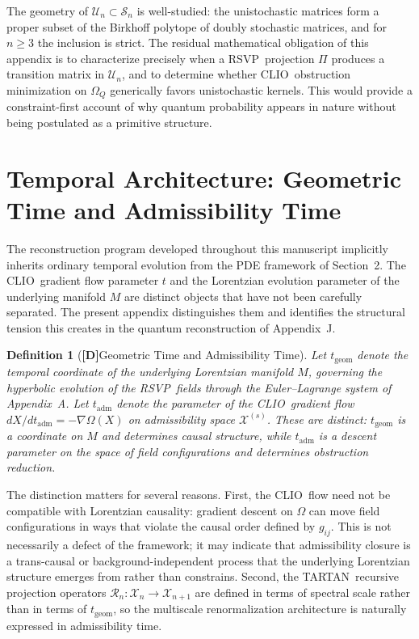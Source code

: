 \documentclass[12pt,a4paper]{article}
\newcommand{\claimD}{\textbf{[D]}\;}
\newtheorem{defn}{Definition}[section]
\newcommand{\RSVP}{\textrm{RSVP}}
\newcommand{\CLIO}{\textrm{CLIO}}
\newcommand{\TARTAN}{\textrm{TARTAN}}
\newcommand{\Field}{\mathcal{X}}
\begin{document}
The geometry of $\mathcal{U}_n\subset\mathcal{S}_n$ is well-studied: the
unistochastic matrices form a proper subset of the Birkhoff polytope of doubly
stochastic matrices, and for $n\geq 3$ the inclusion is strict. The residual
mathematical obligation of this appendix is to characterize precisely when a
\RSVP\ projection $\Pi$ produces a transition matrix in $\mathcal{U}_n$,
and to determine whether \CLIO\ obstruction minimization on $\Omega_Q$ generically
favors unistochastic kernels. This would provide a constraint-first account of
why quantum probability appears in nature without being postulated as a
primitive structure.

\section{Temporal Architecture: Geometric Time and Admissibility Time}

The reconstruction program developed throughout this manuscript implicitly
inherits ordinary temporal evolution from the PDE framework of Section~2.
The \CLIO\ gradient flow parameter $t$ and the Lorentzian evolution parameter
of the underlying manifold $M$ are distinct objects that have not been
carefully separated. The present appendix distinguishes them and identifies
the structural tension this creates in the quantum reconstruction of
Appendix~J.

\begin{defn}[\claimD Geometric Time and Admissibility Time]
Let $t_\mathrm{geom}$ denote the temporal coordinate of the underlying
Lorentzian manifold $M$, governing the hyperbolic evolution of the \RSVP\
fields through the Euler--Lagrange system of Appendix~A. Let $t_\mathrm{adm}$
denote the parameter of the \CLIO\ gradient flow $dX/dt_\mathrm{adm}
=-\nabla\Omega(X)$ on admissibility space $\Field^{(s)}$. These are distinct:
$t_\mathrm{geom}$ is a coordinate on $M$ and determines causal structure,
while $t_\mathrm{adm}$ is a descent parameter on the space of field
configurations and determines obstruction reduction.
\end{defn}

The distinction matters for several reasons. First, the \CLIO\ flow need not
be compatible with Lorentzian causality: gradient descent on $\Omega$ can
move field configurations in ways that violate the causal order defined by
$g_{ij}$. This is not necessarily a defect of the framework; it may indicate
that admissibility closure is a trans-causal or background-independent
process that the underlying Lorentzian structure emerges from rather than
constrains. Second, the \TARTAN\ recursive projection operators
$\mathcal{R}_n:\Field_n\to\Field_{n+1}$ are defined in terms of spectral
scale rather than in terms of $t_\mathrm{geom}$, so the multiscale
renormalization architecture is naturally expressed in admissibility time.
\end{document}

